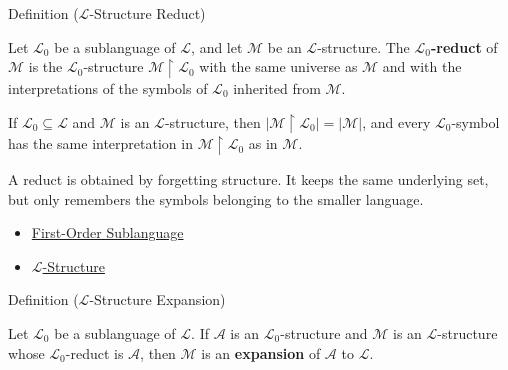 \begin{definitionbox}{Definition ($\mathcal{L}$-Structure Reduct)}
\begin{definition}\label{def:l-structure-reduct}
Let $\mathcal{L}_0$ be a sublanguage of $\mathcal{L}$, and let
$\mathcal{M}$ be an $\mathcal{L}$-structure. The
\textbf{$\mathcal{L}_0$-reduct} of $\mathcal{M}$ is the
$\mathcal{L}_0$-structure $\mathcal{M}\!\upharpoonright\!\mathcal{L}_0$
with the same universe as $\mathcal{M}$ and with the interpretations of the
symbols of $\mathcal{L}_0$ inherited from $\mathcal{M}$.
\end{definition}
\end{definitionbox}

\begin{remark*}
If $\mathcal{L}_0\subseteq\mathcal{L}$ and $\mathcal{M}$ is an
$\mathcal{L}$-structure, then
$|\mathcal{M}\!\upharpoonright\!\mathcal{L}_0|=|\mathcal{M}|$, and every
$\mathcal{L}_0$-symbol has the same interpretation in
$\mathcal{M}\!\upharpoonright\!\mathcal{L}_0$ as in $\mathcal{M}$.
\end{remark*}

\begin{remark*}[Interpretation]
A reduct is obtained by forgetting structure. It keeps the same underlying
set, but only remembers the symbols belonging to the smaller language.
\end{remark*}

\begin{dependencies}
\begin{itemize}
  \item \hyperref[def:first-order-sublanguage]{First-Order Sublanguage}
  \item \hyperref[def:l-structure]{$\mathcal{L}$-Structure}
\end{itemize}
\end{dependencies}

\begin{definitionbox}{Definition ($\mathcal{L}$-Structure Expansion)}
\begin{definition}\label{def:l-structure-expansion}
Let $\mathcal{L}_0$ be a sublanguage of $\mathcal{L}$. If
$\mathcal{A}$ is an $\mathcal{L}_0$-structure and $\mathcal{M}$ is an
$\mathcal{L}$-structure whose $\mathcal{L}_0$-reduct is $\mathcal{A}$, then
$\mathcal{M}$ is an \textbf{expansion} of $\mathcal{A}$ to $\mathcal{L}$.
\end{definition}
\end{definitionbox}

